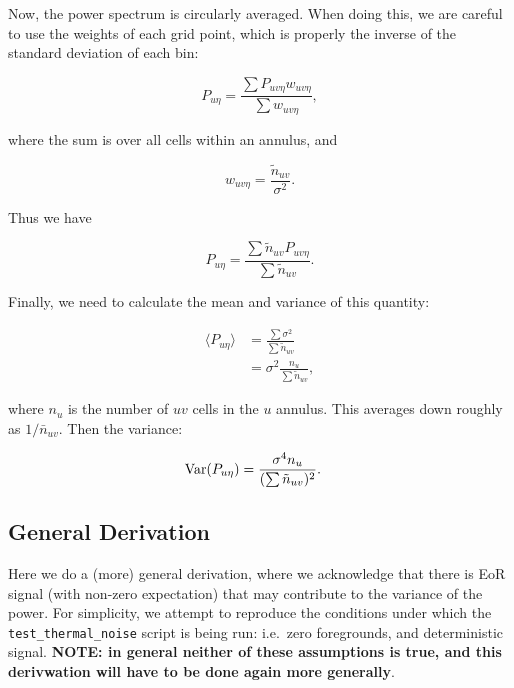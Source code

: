 \documentclass[11pt]{article}
\begin{document}
    Now, the power spectrum is circularly averaged. When doing this, we are
careful to use the weights of each grid point, which is properly the
inverse of the standard deviation of each bin:

\begin{equation}
    P_{u\eta} = \frac{\sum P_{uv\eta} w_{uv\eta}}{\sum w_{uv\eta}},
\end{equation}

where the sum is over all cells within an annulus, and

\begin{equation}
    w_{uv\eta}  = \frac{\tilde{n}_{uv}}{\sigma^2}.
\end{equation}

    Thus we have

\begin{equation}
    P_{u\eta} = \frac{\sum \tilde{n}_{uv} P_{uv\eta} }{\sum  \tilde{n}_{uv}}.
\end{equation}

    Finally, we need to calculate the mean and variance of this quantity:

\begin{align}
    \langle P_{u\eta} \rangle &= \frac{\sum \sigma^2}{\sum \tilde{n}_{uv}} \\
    &=\sigma^2 \frac{n_u}{\sum \tilde{n}_{uv}},
\end{align}

where \(n_u\) is the number of \(uv\) cells in the \(u\) annulus. This
averages down roughly as \(1/\bar{n}_{uv}\). Then the variance:

\begin{align}
    {\rm Var}(P_{u\eta}) &= \frac{\sigma^4 n_u}{(\sum \tilde{n}_{uv})^2}.
\end{align}

    \hypertarget{general-derivation}{%
\subsection{General Derivation}\label{general-derivation}}

    Here we do a (more) general derivation, where we acknowledge that there
is EoR signal (with non-zero expectation) that may contribute to the
variance of the power. For simplicity, we attempt to reproduce the
conditions under which the \texttt{test\_thermal\_noise} script is being
run: i.e.~zero foregrounds, and deterministic signal. \textbf{NOTE: in
general neither of these assumptions is true, and this derivwation will
have to be done again more generally}.
\end{document}
